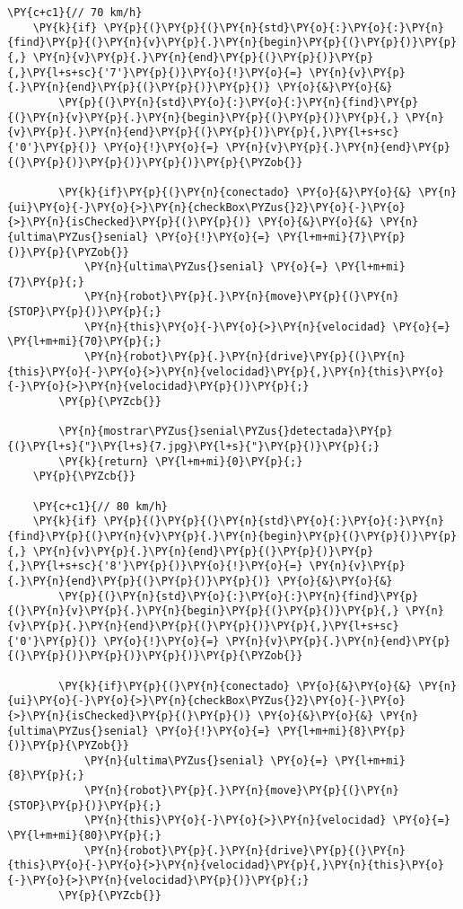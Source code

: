 \begin{Verbatim}[commandchars=\\\{\}]
    \PY{c+c1}{// 70 km/h}
    \PY{k}{if} \PY{p}{(}\PY{p}{(}\PY{n}{std}\PY{o}{:}\PY{o}{:}\PY{n}{find}\PY{p}{(}\PY{n}{v}\PY{p}{.}\PY{n}{begin}\PY{p}{(}\PY{p}{)}\PY{p}{,} \PY{n}{v}\PY{p}{.}\PY{n}{end}\PY{p}{(}\PY{p}{)}\PY{p}{,}\PY{l+s+sc}{'7'}\PY{p}{)}\PY{o}{!}\PY{o}{=} \PY{n}{v}\PY{p}{.}\PY{n}{end}\PY{p}{(}\PY{p}{)}\PY{p}{)} \PY{o}{&}\PY{o}{&}
        \PY{p}{(}\PY{n}{std}\PY{o}{:}\PY{o}{:}\PY{n}{find}\PY{p}{(}\PY{n}{v}\PY{p}{.}\PY{n}{begin}\PY{p}{(}\PY{p}{)}\PY{p}{,} \PY{n}{v}\PY{p}{.}\PY{n}{end}\PY{p}{(}\PY{p}{)}\PY{p}{,}\PY{l+s+sc}{'0'}\PY{p}{)} \PY{o}{!}\PY{o}{=} \PY{n}{v}\PY{p}{.}\PY{n}{end}\PY{p}{(}\PY{p}{)}\PY{p}{)}\PY{p}{)}\PY{p}{\PYZob{}}

        \PY{k}{if}\PY{p}{(}\PY{n}{conectado} \PY{o}{&}\PY{o}{&} \PY{n}{ui}\PY{o}{-}\PY{o}{>}\PY{n}{checkBox\PYZus{}2}\PY{o}{-}\PY{o}{>}\PY{n}{isChecked}\PY{p}{(}\PY{p}{)} \PY{o}{&}\PY{o}{&} \PY{n}{ultima\PYZus{}senial} \PY{o}{!}\PY{o}{=} \PY{l+m+mi}{7}\PY{p}{)}\PY{p}{\PYZob{}}
            \PY{n}{ultima\PYZus{}senial} \PY{o}{=} \PY{l+m+mi}{7}\PY{p}{;}
            \PY{n}{robot}\PY{p}{.}\PY{n}{move}\PY{p}{(}\PY{n}{STOP}\PY{p}{)}\PY{p}{;}
            \PY{n}{this}\PY{o}{-}\PY{o}{>}\PY{n}{velocidad} \PY{o}{=} \PY{l+m+mi}{70}\PY{p}{;}
            \PY{n}{robot}\PY{p}{.}\PY{n}{drive}\PY{p}{(}\PY{n}{this}\PY{o}{-}\PY{o}{>}\PY{n}{velocidad}\PY{p}{,}\PY{n}{this}\PY{o}{-}\PY{o}{>}\PY{n}{velocidad}\PY{p}{)}\PY{p}{;}
        \PY{p}{\PYZcb{}}

        \PY{n}{mostrar\PYZus{}senial\PYZus{}detectada}\PY{p}{(}\PY{l+s}{"}\PY{l+s}{7.jpg}\PY{l+s}{"}\PY{p}{)}\PY{p}{;}
        \PY{k}{return} \PY{l+m+mi}{0}\PY{p}{;}
    \PY{p}{\PYZcb{}}

    \PY{c+c1}{// 80 km/h}
    \PY{k}{if} \PY{p}{(}\PY{p}{(}\PY{n}{std}\PY{o}{:}\PY{o}{:}\PY{n}{find}\PY{p}{(}\PY{n}{v}\PY{p}{.}\PY{n}{begin}\PY{p}{(}\PY{p}{)}\PY{p}{,} \PY{n}{v}\PY{p}{.}\PY{n}{end}\PY{p}{(}\PY{p}{)}\PY{p}{,}\PY{l+s+sc}{'8'}\PY{p}{)}\PY{o}{!}\PY{o}{=} \PY{n}{v}\PY{p}{.}\PY{n}{end}\PY{p}{(}\PY{p}{)}\PY{p}{)} \PY{o}{&}\PY{o}{&} 
        \PY{p}{(}\PY{n}{std}\PY{o}{:}\PY{o}{:}\PY{n}{find}\PY{p}{(}\PY{n}{v}\PY{p}{.}\PY{n}{begin}\PY{p}{(}\PY{p}{)}\PY{p}{,} \PY{n}{v}\PY{p}{.}\PY{n}{end}\PY{p}{(}\PY{p}{)}\PY{p}{,}\PY{l+s+sc}{'0'}\PY{p}{)} \PY{o}{!}\PY{o}{=} \PY{n}{v}\PY{p}{.}\PY{n}{end}\PY{p}{(}\PY{p}{)}\PY{p}{)}\PY{p}{)}\PY{p}{\PYZob{}}

        \PY{k}{if}\PY{p}{(}\PY{n}{conectado} \PY{o}{&}\PY{o}{&} \PY{n}{ui}\PY{o}{-}\PY{o}{>}\PY{n}{checkBox\PYZus{}2}\PY{o}{-}\PY{o}{>}\PY{n}{isChecked}\PY{p}{(}\PY{p}{)} \PY{o}{&}\PY{o}{&} \PY{n}{ultima\PYZus{}senial} \PY{o}{!}\PY{o}{=} \PY{l+m+mi}{8}\PY{p}{)}\PY{p}{\PYZob{}}
            \PY{n}{ultima\PYZus{}senial} \PY{o}{=} \PY{l+m+mi}{8}\PY{p}{;}
            \PY{n}{robot}\PY{p}{.}\PY{n}{move}\PY{p}{(}\PY{n}{STOP}\PY{p}{)}\PY{p}{;}
            \PY{n}{this}\PY{o}{-}\PY{o}{>}\PY{n}{velocidad} \PY{o}{=} \PY{l+m+mi}{80}\PY{p}{;}
            \PY{n}{robot}\PY{p}{.}\PY{n}{drive}\PY{p}{(}\PY{n}{this}\PY{o}{-}\PY{o}{>}\PY{n}{velocidad}\PY{p}{,}\PY{n}{this}\PY{o}{-}\PY{o}{>}\PY{n}{velocidad}\PY{p}{)}\PY{p}{;}
        \PY{p}{\PYZcb{}}


\end{Verbatim}
